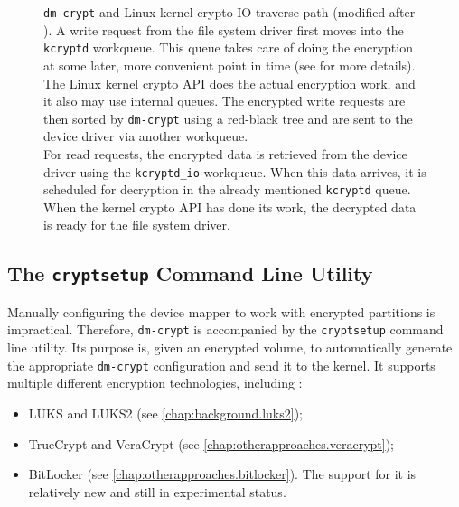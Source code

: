 \begin{figure}[htb!]
	\caption[
		\texttt{dm-crypt} and Linux kernel crypto IO traverse path
	]{
		\texttt{dm-crypt} and Linux kernel crypto IO traverse path (modified after \cite{Korchagin2020}). A write request from the file system driver first moves into the \texttt{kcryptd} workqueue. This queue takes care of doing the encryption at some later, more convenient point in time (see \cite{Linux} for more details). The Linux kernel crypto API does the actual encryption work, and it also may use internal queues. The encrypted write requests are then sorted by \texttt{dm-crypt} using a red-black tree and are sent to the device driver via another workqueue. \\
		For read requests, the encrypted data is retrieved from the device driver using the \texttt{kcryptd\_io} workqueue. When this data arrives, it is scheduled for decryption in the already mentioned \texttt{kcryptd} queue. When the kernel crypto API has done its work, the decrypted data is ready for the file system driver.
	}
	\label{fig:otherapproaches.linux.dmcryptio}
\end{figure}

\subsection{The \texttt{cryptsetup} Command Line Utility}
\label{chap:otherapproaches.linux.cryptsetup}
Manually configuring the device mapper to work with encrypted partitions is impractical. Therefore, \texttt{dm-crypt} is accompanied by the \texttt{cryptsetup} command line utility. Its purpose is, given an encrypted volume, to automatically generate the appropriate \texttt{dm-crypt} configuration and send it to the kernel. It supports multiple different encryption technologies, including \cite{ManCryptsetup}:
\begin{itemize}
	\item LUKS and LUKS2 (see \autoref{chap:background.luks2});
	\item TrueCrypt and VeraCrypt (see \autoref{chap:otherapproaches.veracrypt});
	\item BitLocker (see \autoref{chap:otherapproaches.bitlocker}). The support for it is relatively new and still in experimental status.
\end{itemize}

